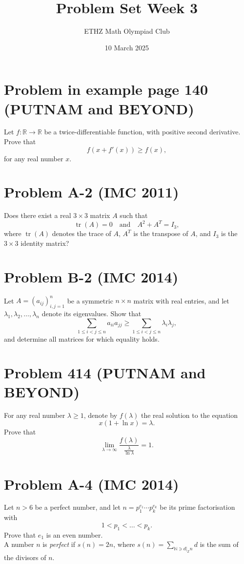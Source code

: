 \documentclass[11pt, a4paper, oneside]{article}
\title{Problem Set Week 3}
\author{ETHZ Math Olympiad Club}
\date{10 March 2025}
\newcommand{\problem}[1][]{\section{#1} \hfill \par}
\theoremstyle{remark}
\begin{document}
\maketitle
\problem[Problem in example page 140 (PUTNAM and BEYOND)]
Let $f : \mathbb{R} \to \mathbb{R}$ be a twice-differentiable function, with positive second derivative. 
Prove that
\[
f\left(x + f'(x)\right) \geq f(x),
\]
for any real number $x$.

\problem[Problem A-2 (IMC 2011)]
Does there exist a real $3 \times 3$ matrix $A$ such that 
\[
\operatorname{tr}(A) = 0
\quad\text{and}\quad
A^2 + A^T = I_3,
\]
where $\operatorname{tr}(A)$ denotes the trace of $A$, $A^T$ is the transpose of $A$, and $I_3$ is the $3 \times 3$ identity matrix?

\problem[Problem B-2 (IMC 2014)]
Let \( A = (a_{ij})_{i,j=1}^{n} \) be a symmetric \( n \times n \) matrix with real entries, and let \( \lambda_{1}, \lambda_{2}, \ldots, \lambda_{n} \) denote its eigenvalues. Show that
\[
\sum_{1 \leq i < j \leq n} a_{ii} a_{jj} \geq \sum_{1 \leq i < j \leq n} \lambda_{i} \lambda_{j},
\]
and determine all matrices for which equality holds.

\problem[Problem 414 (PUTNAM and BEYOND)]
For any real number $\lambda \geq 1$, denote by $f(\lambda)$ the real solution to the equation
\[
x(1 + \ln x) = \lambda.
\]
Prove that
\[
\lim_{\lambda \to \infty} \frac{f(\lambda)}{\frac{\lambda}{\ln \lambda}} = 1.
\]

\problem[Problem A-4 (IMC 2014)]
Let \(n > 6\) be a perfect number, and let \(n = p_{1}^{e_{1}} \cdots p_{k}^{e_{k}}\) be its prime factorisation with \[1 < p_{1} < \ldots < p_{k}.\] Prove that \(e_{1}\) is an even number.
\\
A number \(n\) is \textit{perfect} if \(s(n) = 2n\), where \(s(n)=\sum_{\mathbb{N}\ni d|_{\mathbb{Z}}n}d\) is the sum of the divisors of \(n\).
\end{document}
